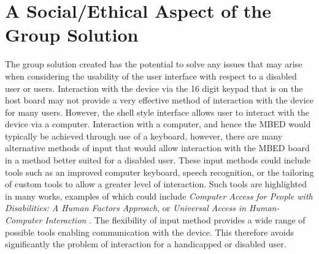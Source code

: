 \section{A Social/Ethical Aspect of the Group Solution} 

The group solution created has the potential to solve any issues that may arise 
when considering the usability of the user interface with respect to a disabled 
user or users. Interaction with the device via the 16 digit keypad that is on 
the host board may not provide a very effective method of interaction with the 
device for many users. However, the shell style interface allows user to interact 
with the device via a computer. Interaction with a computer, and hence the MBED 
would typically be achieved through use of a keyboard, however, there are many 
alternative methods of input that would allow interaction with the MBED board in 
a method better suited for a disabled user. These input methods could include 
tools such as an improved computer keyboard, speech recognition, or the tailoring 
of custom tools to allow a greater level of interaction. Such tools are 
highlighted in many works, examples of which could include \textit{Computer Access for People with 
Disabilities: A Human Factors Approach}, or \textit{Universal Access in 
Human-Computer Interaction} \cite{disabled-book, disabled-book2}. The flexibility of 
input method provides a wide range of possible tools enabling communication with 
the device. This therefore avoids significantly the problem of interaction for 
a handicapped or disabled user. 
